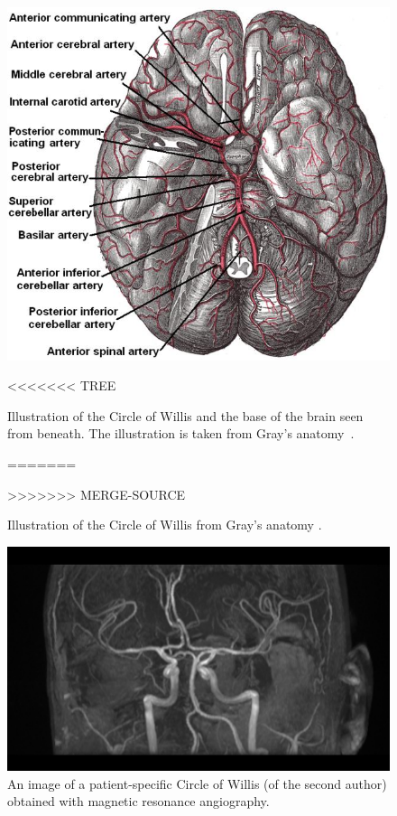 \begin{figure}
  \begin{center}
    \includegraphics[width=\largefig]{chapters/kvs-2/png/cow_gray_1.png} \\
  \end{center}
<<<<<<< TREE
  \caption{Illustration of the Circle of Willis and the base of the brain
      seen from beneath. The illustration is  taken from Gray's anatomy~\citep{Gray1897}.}
=======
  \caption{Illustration of the Circle of Willis from Gray's anatomy \citep{Gray1897}.}
>>>>>>> MERGE-SOURCE
  \label{fig:kvs-2:textbook-circle}
\end{figure}

\begin{figure}
  \begin{center}
      \includegraphics[width=\largefig]{chapters/kvs-2/pdf/kentus.pdf}
  \end{center}
  \caption{An image of a patient-specific Circle of Willis (of the second author) obtained with magnetic resonance angiography.}
  \label{fig:kvs-2:circle_kent}
\end{figure}

